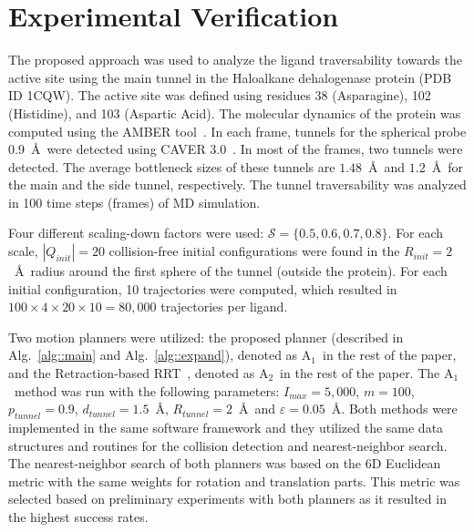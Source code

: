 \documentclass[usletter, 10pt, conference]{ieeeconf} %
\def\dt{d_{tunnel}}
\def\QI{Q_{init}}
\def\RI{R_{init}}
\def\rv{R_{tunnel}}
\def\Imax{I_{max}} %
\def\gb{p_{tunnel}}
\def\S{\mathcal{S}}
\def\RA{A$_{1}$}
\def\RB{A$_{2}$}
\begin{document}
\section{Experimental Verification}

The proposed approach was used to analyze the ligand traversability towards the active site using the main tunnel in the Haloalkane dehalogenase protein (PDB ID 1CQW).
The active site was defined using residues 38 (Asparagine), 102 (Histidine), and 103 (Aspartic Acid).
The molecular dynamics of the protein was computed using the AMBER tool~\cite{amber}.
In each frame, tunnels for the spherical probe 0.9~\AA\ were detected using CAVER 3.0~\cite{caver3}. 
In most of the frames, two tunnels were detected.
The average bottleneck sizes of these tunnels are $1.48$~\AA\ and $1.2$~\AA\ for the main and the side tunnel, respectively.
The tunnel traversability was analyzed in 100 time steps (frames) of MD simulation.

Four different scaling-down factors were used: $\S=\{0.5,0.6,0.7,0.8\}$.
For each scale, $|\QI|=20$ collision-free initial configurations were found in the $\RI=2$~\AA\ radius around the first sphere of the tunnel (outside the protein).
For each initial configuration, 10 trajectories were computed, which resulted
in $100 \times 4 \times 20 \times 10 = 80,000$ trajectories per ligand.

Two motion planners were utilized: the proposed planner (described in Alg.~\ref{alg::main} and Alg.~\ref{alg::expand}), denoted as \RA\ in the rest of the paper, and the Retraction-based RRT~\cite{zhangRetraction}, denoted as \RB\ in the rest of the paper.
The \RA\ method was run with the following parameters:
$\Imax=5,000$, $m=100$, $\gb=0.9$, $\dt=1.5$~\AA, $\rv=2$~\AA\ and $\varepsilon=0.05$~\AA.
Both methods were implemented in the same software framework and they utilized the same data structures and routines for the collision detection and nearest-neighbor search.
The nearest-neighbor search of both planners was based on the 6D Euclidean metric with the same weights for rotation and translation parts.
This metric was selected based on preliminary experiments with both planners as it resulted in the highest success rates.
\end{document}
